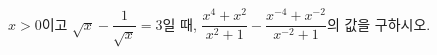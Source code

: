 $x>0$이고 $\sqrt{x}-\dfrac{1}{\sqrt{x}}=3$일 때, $\dfrac{x^4+x^2}{x^2+1}-\dfrac{x^{-4}+x^{-2}}{x^{-2}+1}$의 값을 구하시오.
